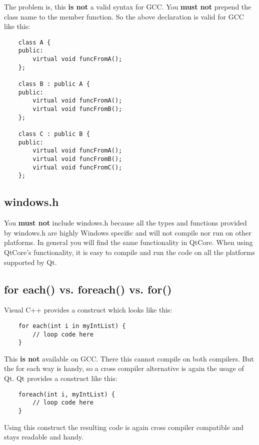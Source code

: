 The problem is, this \textbf{is not} a valid syntax for GCC. You \textbf{must not} prepend the class name to the member function. So the above declaration is valid for GCC like this:
\begin{verbatim}
    class A {
    public:
        virtual void funcFromA();
    };
    
    class B : public A {
    public:
        virtual void funcFromA();
        virtual void funcFromB();
    };
    
    class C : public B {
    public:
        virtual void funcFromA();
        virtual void funcFromB();
        virtual void funcFromC();
    };
\end{verbatim}

\subsection{windows.h} You \textbf{must not} include windows.h because all the types and functions provided by windows.h are highly Windows specific and will not compile nor run on other platforms. In general you will find the same functionality in QtCore. When using QtCore's functionality, it is easy to compile and run the code on all the platforms supported by Qt.

\subsection{for each() vs. foreach() vs. for()} Visual C++ provides a construct which looks like this:
\begin{verbatim}
    for each(int i in myIntList) {
        // loop code here
    }
\end{verbatim}
This \textbf{is not} available on GCC. There this cannot compile on both compilers. But the for each way is handy, so a cross compiler alternative is again the usage of Qt. Qt provides a construct like this:
\begin{verbatim}
    foreach(int i, myIntList) {
        // loop code here
    }
\end{verbatim}
Using this construct the resulting code is again cross compiler compatible and stays readable and handy.

